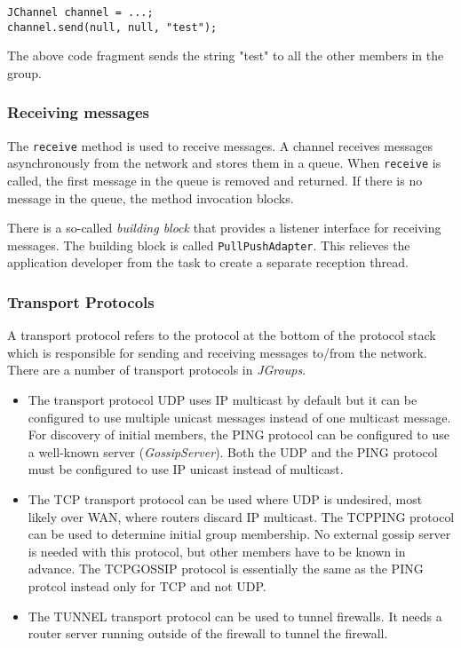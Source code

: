 \begin{verbatim}
JChannel channel = ...;
channel.send(null, null, "test");
\end{verbatim}

The above code fragment sends the string "test" to all the other members in the group.

\subsubsection{Receiving messages}
The \texttt{receive} method is used to receive messages. A channel receives messages asynchronously from the network and stores them in a queue. When \texttt{receive} is called, the first message in the queue is removed and returned. If there is no message in the queue, the method invocation blocks.

There is a so-called \emph{building block} that provides a listener interface for receiving messages. The building block is called \texttt{PullPushAdapter}. This relieves the application developer from the task to create a separate reception thread. 

\subsubsection{Transport Protocols}
A transport protocol refers to the protocol at the bottom of the protocol stack which is responsible for sending and receiving messages to/from the network. There are a number of transport protocols in \emph{JGroups}.
\begin{itemize}
 \item The transport protocol UDP uses IP multicast by default but it can be configured to use multiple unicast messages instead of one multicast message. For discovery of initial members, the PING protocol can be configured to use a well-known server (\emph{GossipServer}). Both the UDP and the PING protocol must be configured to use IP unicast instead of multicast.
 \item The TCP transport protocol can be used where UDP is undesired, most likely over WAN, where routers discard IP multicast. The TCPPING protocol can be used to determine initial group membership. No external gossip server is needed with this protocol, but other members have to be known in advance. The TCPGOSSIP protocol is essentially the same as the PING protcol instead only for TCP and not UDP.
 \item The TUNNEL transport protocol can be used to tunnel firewalls. It needs a router server running outside of the firewall to tunnel the firewall.
\end{itemize}


